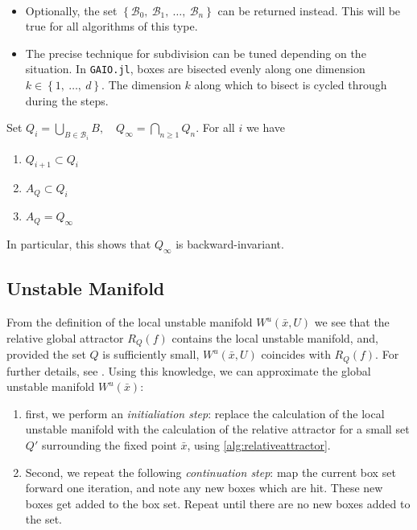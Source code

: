 \begin{remark}\
    \begin{itemize}
        \item Optionally, the set 
        $\left\{ \mathcal{B}_0,\ \mathcal{B}_1,\ \dotsc,\ \mathcal{B}_n \right\}$
        can be returned instead. This will be true for all algorithms of this type.
        \item The precise technique for subdivision can be tuned depending on the situation. 
        In \texttt{GAIO.jl}, boxes are bisected evenly along one dimension 
        $k \in \left\{1,\ \dotsc,\ d\right\}$. The dimension $k$ along which to bisect is 
        cycled through during the steps. \\
    \end{itemize}
\end{remark}

\begin{proposition}\label{thm:cover}
    \cite*{algGAIO,subalg} Set 
    $Q_i = \bigcup_{B \in \mathcal{B}_i} B,\quad Q_\infty = \bigcap_{n \geq 1} Q_n$. 
    For all $i$ we have

    \begin{enumerate}
        \item $Q_{i+1} \subset Q_i$
        \item $A_Q \subset Q_i$ 
        \item $A_Q = Q_\infty$
    \end{enumerate}

    In particular, this shows that $Q_\infty$ is backward-invariant. 
\end{proposition}


\subsection{Unstable Manifold}

From the definition of the local unstable manifold $W^u(\bar{x}, U)$ we see that the 
relative global attractor $R_Q(f)$ contains the local unstable manifold, and, provided the 
set $Q$ is sufficiently small, $W^u(\bar{x}, U)$ coincides with $R_Q(f)$. For further 
details, see \cite*{manifold, geodynbook}. Using this knowledge, we can approximate the 
global unstable manifold $W^u(\bar{x})$: 

\begin{enumerate}
    \item first, we perform an \emph{initialiation step}: replace the calculation of 
    the local unstable manifold with the calculation of the relative
    attractor for a small set $Q'$ surrounding the fixed point $\bar{x}$, using 
    \autoref{alg:relativeattractor}. 
    \item Second, we repeat the following \emph{continuation step}: map 
    the current box set forward one iteration, and note any new boxes which are hit. These 
    new boxes get added to the box set. Repeat until there are no new boxes
    added to the set. 
\end{enumerate}


